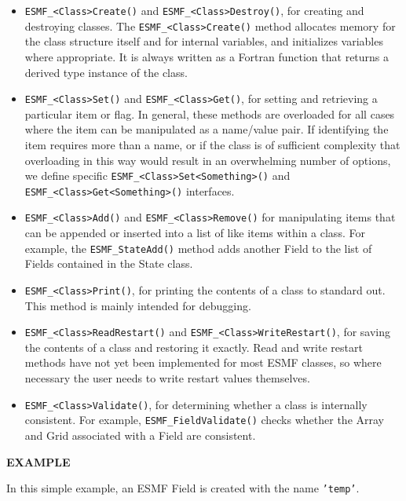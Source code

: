 \begin{itemize}

\item {\tt ESMF\_<Class>Create()} and {\tt ESMF\_<Class>Destroy()}, for creating and 
destroying classes.  The {\tt ESMF\_<Class>Create()} method allocates 
memory for the class structure itself and for internal variables, and
initializes variables where appropriate.  It is always written as a 
Fortran function that returns a derived type instance of the class.

\item {\tt ESMF\_<Class>Set()} and {\tt ESMF\_<Class>Get()}, for setting 
and retrieving a particular item or flag.  In general, these methods are
overloaded for all cases where the item can be manipulated as a
name/value pair.  If identifying the item requires more than a 
name, or if the class is of sufficient complexity that overloading
in this way would result in an overwhelming number of options, we 
define specific {\tt ESMF\_<Class>Set<Something>()} and 
{\tt ESMF\_<Class>Get<Something>()} interfaces.

\item {\tt ESMF\_<Class>Add()} and 
{\tt ESMF\_<Class>Remove()} for manipulating 
items that can be appended or inserted into a list of like
items within a class.  For example, the {\tt ESMF\_StateAdd()}
method adds another Field to the list of Fields contained
in the State class.

\item {\tt ESMF\_<Class>Print()}, for printing the contents of a class to 
standard out.  This method is mainly intended for debugging.

\item {\tt ESMF\_<Class>ReadRestart()} and {\tt ESMF\_<Class>WriteRestart()}, 
for saving the contents of a class and restoring it exactly.  Read
and write restart methods have not yet been implemented for most
ESMF classes, so where necessary the user needs to write restart 
values themselves.

\item {\tt ESMF\_<Class>Validate()}, for determining whether a class is 
internally consistent.  For example, {\tt ESMF\_FieldValidate()} checks 
whether the Array and Grid associated with a Field are consistent.

\end{itemize}

{\bf EXAMPLE}

In this simple example, an ESMF Field is created with the 
name {\tt 'temp'}.  

